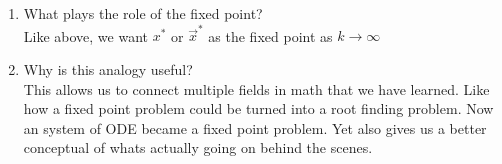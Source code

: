 \documentclass[12pt]{article}
\begin{document}
\begin{enumerate}
\begin{enumerate}
        \item What plays the role of the fixed point? \\
        Like above, we want $x^*$ or $\vec{x}^*$ as the fixed point as $k \rightarrow \infty$

        \item Why is this analogy useful? \\
        This allows us to connect multiple fields in math that we have learned. 
        Like how a fixed point problem could be turned into a root finding problem. 
        Now an system of ODE became a fixed point problem.
        Yet also gives us a better conceptual of whats actually going on behind the scenes.
        

    \end{enumerate}
\end{enumerate}
\end{document}
